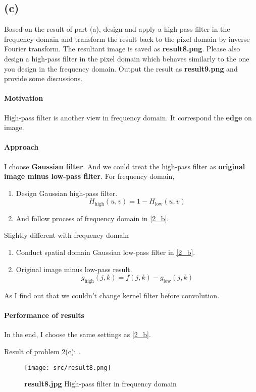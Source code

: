 \subsection{(c)}\label{2_c}
Based on the result of part (a), design and apply a high-pass filter in the frequency domain and transform the result back to the pixel domain by inverse Fourier transform. The resultant image is saved as \textbf{result8.png}. Please also design a high-pass filter in the pixel domain which behaves similarly to the one you design in the frequency domain. Output the result as \textbf{result9.png} and provide some discussions.

\paragraph{Motivation}
High-pass filter is another view in frequency domain. It correspond the \textbf{edge} on image.

\paragraph{Approach}
I choose \textbf{Gaussian filter}. And we could treat the high-pass filter as \textbf{original image minus low-pass filter}.
For frequency domain,
\begin{enumerate}
     \item Design Gaussian high-pass filter.
	\[
	    H_{\mbox{high}}(u, v) = 1 - H_{\mbox{low}}(u, v)
	\]
    \item And follow process of frequency domain in \ref{2_b}.
\end{enumerate}

Slightly different with frequency domain
\begin{enumerate}
    \item Conduct spatial domain Gaussian low-pass filter in \ref{2_b}.
    \item Original image minus low-pass result.
	\[
	    g_{\mbox{high}}(j, k) = f(j, k) - g_{\mbox{low}}(j, k)
	\]
\end{enumerate}
As I find out that we couldn't change kernel filter before convolution.

\paragraph{Performance of results}
In the end, I choose the same settings as \ref{2_b}.

Result of problem 2(c): .
\begin{figure}
    \centering
    \texttt{[image: src/result8.png]}
    \caption{\textbf{result8.jpg} High-pass filter in frequency domain}
    \label{result8}
\end{figure}

